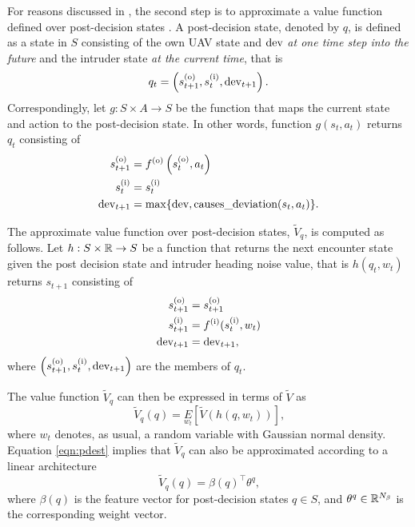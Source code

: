 For reasons discussed in , the second step is to approximate a value function defined over post-decision states \cite{DB:05}. A post-decision state, denoted by $q$, is defined as a state in $S$ consisting of the own UAV state and $\mathrm{dev }$ \emph{at one time step into the future} and the intruder state \emph{at the current time}, that is
\begin{equation} \label{eqn:pd}
    q_t = \left(s^{(\mathrm{o})}_{t+1}, s^{(\mathrm{i})}_t, \mathrm{dev }_{t+1}\right) \text{.}
\end{equation}
Correspondingly, let $g:S\times A\to S$ be the function that maps the current state and action to the post-decision state. In other words, function $g(s_t,a_t)$ returns $q_t$ consisting of
\begin{align}\label{eqn:g}
    s^{(\mathrm{o})}_{t+1} &= f^{(\mathrm{o})}\left(s^{(\mathrm{o})}_t, a_t \right) \nonumber\\
    s^{(\mathrm{i})}_t     &= s^{(\mathrm{i})}_t \nonumber\\
    \mathrm{dev }_{t+1} &= \max\{\mathrm{dev }, \text{causes\_deviation}(s_t,a_t)\} \text{.}
\end{align}

The approximate value function over post-decision states, $\tilde{V}_q$, is computed as follows.
Let $h:S \times \mathbb{R} \to S$ be a function that returns the next encounter state given the post decision state and intruder heading noise value, that is $h(q_t,w_t)$ returns $s_{t+1}$ consisting of
\begin{align}
    s^{(\mathrm{o})}_{t+1} &= s^{(\mathrm{o})}_{t+1} \\
    s^{(\mathrm{i})}_{t+1} &= f^{(\mathrm{i})}(s^{(\mathrm{i})}_{t}, w_t) \\
    \mathrm{dev }_{t+1} &= \mathrm{dev }_{t+1} \text{,}
\end{align}
where $\left(s^{(\mathrm{o})}_{t+1}, s^{(\mathrm{i})}_t, \mathrm{dev }_{t+1}\right)$ are the members of $q_t$.

The value function $\tilde{V}_q$ can then be expressed in terms of $\tilde{V}$ as
\begin{equation} \label{eqn:pdest}
    \tilde{V}_q(q) = \underset{w_t}{E} \left[ \tilde{V}\left(h\left(q,w_t\right)\right) \right] \text{,}
\end{equation}
where $w_t$ denotes, as usual, a random variable with Gaussian normal density.  Equation \eqref{eqn:pdest} implies that $\tilde{V}_q$ can also be approximated according to a linear architecture 
\begin{equation}
    \tilde{V}_q(q) = \beta(q)^\top \theta^q \text{,}
\end{equation}
where $\beta(q)$ is the  feature vector for post-decision states $q\in S$, and $\theta^q \in \mathbb{R}^{N_\beta}$ is the corresponding weight vector.


